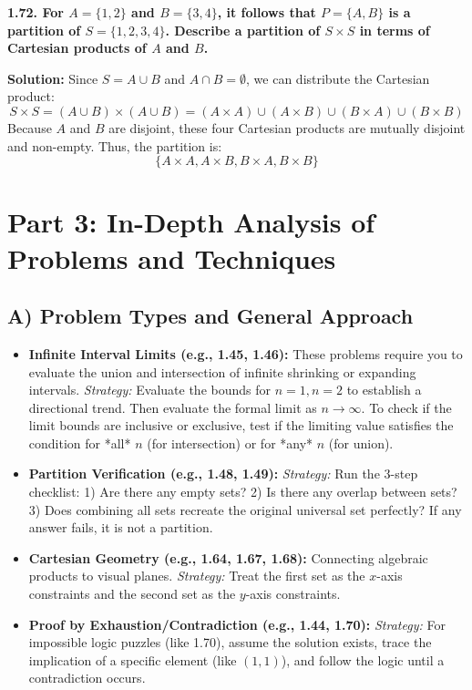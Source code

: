 \documentclass[12pt]{article}
\begin{document}
\hrulefill

\textbf{1.72. For $A = \{1, 2\}$ and $B = \{3, 4\}$, it follows that $P = \{A, B\}$ is a partition of $S = \{1, 2, 3, 4\}$. Describe a partition of $S \times S$ in terms of Cartesian products of $A$ and $B$.}

\textbf{Solution:}
Since $S = A \cup B$ and $A \cap B = \emptyset$, we can distribute the Cartesian product:
\[ S \times S = (A \cup B) \times (A \cup B) = (A \times A) \cup (A \times B) \cup (B \times A) \cup (B \times B) \]
Because $A$ and $B$ are disjoint, these four Cartesian products are mutually disjoint and non-empty. Thus, the partition is:
\[ \{ A \times A, A \times B, B \times A, B \times B \} \]

\newpage
\section{Part 3: In-Depth Analysis of Problems and Techniques}

\subsection{A) Problem Types and General Approach}
\begin{itemize}
    \item \textbf{Infinite Interval Limits (e.g., 1.45, 1.46):} These problems require you to evaluate the union and intersection of infinite shrinking or expanding intervals. 
    \textit{Strategy:} Evaluate the bounds for $n=1, n=2$ to establish a directional trend. Then evaluate the formal limit as $n \to \infty$. To check if the limit bounds are inclusive or exclusive, test if the limiting value satisfies the condition for *all* $n$ (for intersection) or for *any* $n$ (for union).
    \item \textbf{Partition Verification (e.g., 1.48, 1.49):} 
    \textit{Strategy:} Run the 3-step checklist: 1) Are there any empty sets? 2) Is there any overlap between sets? 3) Does combining all sets recreate the original universal set perfectly? If any answer fails, it is not a partition.
    \item \textbf{Cartesian Geometry (e.g., 1.64, 1.67, 1.68):} Connecting algebraic products to visual planes.
    \textit{Strategy:} Treat the first set as the $x$-axis constraints and the second set as the $y$-axis constraints. 
    \item \textbf{Proof by Exhaustion/Contradiction (e.g., 1.44, 1.70):}
    \textit{Strategy:} For impossible logic puzzles (like 1.70), assume the solution exists, trace the implication of a specific element (like $(1,1)$), and follow the logic until a contradiction occurs.
\end{itemize}
\end{document}
